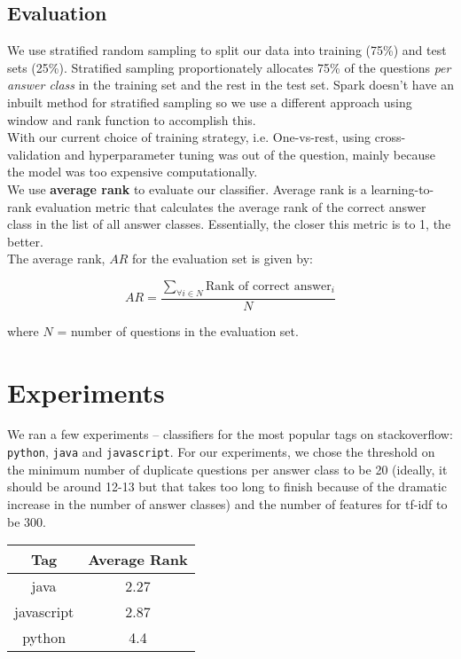 \documentclass{article}
\begin{document}
\subsection{Evaluation}
We use stratified random sampling to split our data into training (75\%) and test sets (25\%). Stratified sampling proportionately allocates 75\% of the questions \textit{per answer class} in the training set and the rest in the test set. Spark doesn't have an inbuilt method for stratified sampling so we use a different approach using window and rank function to accomplish this.\\

With our current choice of training strategy, i.e. One-vs-rest, using cross-validation and hyperparameter tuning was out of the question, mainly because the model was too expensive computationally.\\

We use \textbf{average rank} to evaluate our classifier. Average rank is a learning-to-rank evaluation metric that calculates the average rank of the correct answer class in the list of all answer classes. Essentially, the closer this metric is to 1, the better.\\

The average rank, $AR$ for the evaluation set is given by:

$$AR = \frac{\sum_{\forall i \in N} \text{Rank of correct answer}_i}{N}$$

where $N$ = number of questions in the evaluation set.

\section{Experiments}
We ran a few experiments -- classifiers for the most popular tags  on stackoverflow: \texttt{python}, \texttt{java} and \texttt{javascript}. For our experiments, we chose the threshold on the minimum number of duplicate questions per answer class to be 20 (ideally, it should be around 12-13 but that takes too long to finish because of the dramatic increase in the number of answer classes) and the number of features for tf-idf to be 300.\\

\begin{center}
	\begin{tabular}
		{|c c|} 
		\hline
		Tag & Average Rank\\ 
		\hline\hline
		java & 2.27 \\ 
		\hline
		javascript & 2.87 \\
		\hline
		python & 4.4 \\
		\hline
	\end{tabular}
\end{center}
\end{document}
